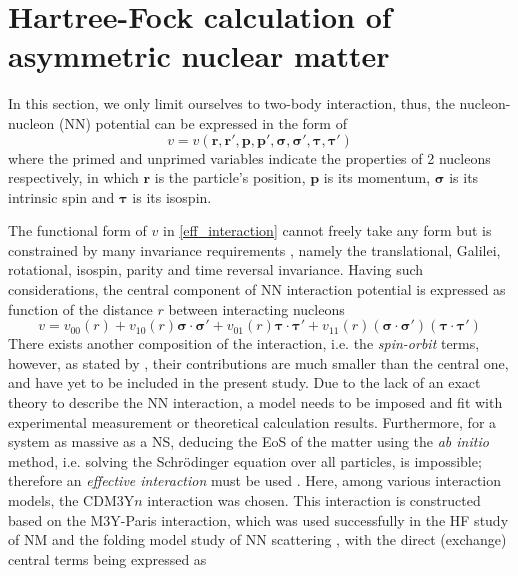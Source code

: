\section{Hartree-Fock calculation of asymmetric nuclear matter}%
\label{sec:hartree_fock_calculation_of_asymmetric_nuclear_matter}

In this section, we only limit ourselves to two-body interaction, thus, the nucleon-nucleon (\gls{NN}) potential can be expressed in the form of
\begin{equation}
        v = v(\bm{r}, \bm{r'}, \bm{p}, \bm{p'}, \bm{\sigma}, \bm{\sigma'}, \bm{\tau}, \bm{\tau'})
        \label{eff_interaction}
\end{equation}
where the primed and unprimed variables indicate the properties of 2 nucleons respectively, in which $\bm{r}$ is the particle's position, $\bm{p}$ is its momentum, $\bm{\sigma}$ is its intrinsic spin and $\bm{\tau}$ is its isospin.\par
The functional form of $v$ in \eqref{eff_interaction} cannot freely take any form but is constrained by many invariance requirements \citep{greiner1996nuclear}, namely the translational, Galilei, rotational, isospin, parity and time reversal invariance. Having such considerations, the central component of \gls{NN} interaction potential is expressed as function of the distance $r$ between interacting nucleons
\begin{equation}
        v = v_{00}(r) + v_{10}(r) \bm{\sigma}\cdot\bm{\sigma'} + v_{01}(r) \bm{\tau}\cdot\bm{\tau'} + v_{11}(r) (\bm{\sigma}\cdot\bm{\sigma'})(\bm{\tau}\cdot\bm{\tau'})
\end{equation}
There exists another composition of the interaction, i.e. the \emph{spin-orbit} terms, however, as stated by \cite{vidana2016role}, their contributions are much smaller than the central one, and have yet to be included in the present study. Due to the lack of an exact theory to describe the \gls{NN} interaction, a model needs to be imposed and fit with experimental measurement or theoretical calculation results. Furthermore, for a system as massive as a \gls{NS}, deducing the \gls{EoS} of the matter using the \emph{ab initio} method, i.e. solving the Schr\"{o}dinger equation over all particles, is impossible; therefore an \emph{effective interaction} must be used \citep{greiner1996nuclear}. Here, among various interaction models, the CDM3Y$n$ interaction was chosen. This interaction is constructed based on the M3Y-Paris interaction, which was used successfully in the \gls{HF} study of \gls{NM} \citep{loan2011equation, tan2016mean, tan2020spin,tan2021equation} and the folding model study of \gls{NN} scattering \citep{khoa1997nuclear,khoa2000generalized}, with the direct (exchange) central terms being expressed as
